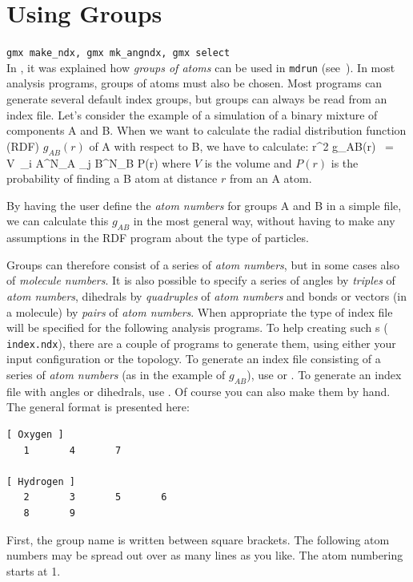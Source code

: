 \section{Using Groups}
\label{sec:usinggroups}
{\tt gmx make_ndx, gmx mk_angndx, gmx select}\\
In , it was explained how {\em groups of
atoms} can be used in {\tt mdrun} (see~).
In most analysis programs, groups
of atoms must also be chosen. Most programs can generate several default
index groups, but groups can always be read from an index file. Let's
consider the example of a simulation of a binary mixture of components A and B. When
we want to calculate the radial distribution function (RDF)
$g_{AB}(r)$ of A with respect to B, we have to calculate:
\pi r^2 g_{AB}(r)      ~=~     V~\sum_{i \in A}^{N_A} \sum_{j \in B}^{N_B} P(r)
\eeq
where $V$ is the volume and $P(r)$ is the probability of finding a B atom
at distance $r$ from an A atom.

By having the user define the {\em atom numbers} for groups A and B in
a simple file, we can calculate this $g_{AB}$ in the most general way, without
having to make any assumptions in the RDF program about the type of 
particles. 

Groups can therefore consist of a series of {\em atom numbers}, but in
some cases also of {\em molecule numbers}.  It is also possible to
specify a series of angles by {\em triples} of {\em atom numbers},
dihedrals by {\em quadruples} of {\em atom numbers} and bonds or
vectors (in a molecule) by {\em pairs} of {\em atom numbers}. When
appropriate the type of index file will be specified for the following
analysis programs.  To help creating such s ({\tt
index.ndx}), there are a couple of programs to generate them, using
either your input configuration or the topology.  To generate an
index file consisting of a series of {\em atom numbers} (as in the
example of $g_{AB}$), use {\tt {}} or
{\tt {}}.  To generate an index file
with angles or dihedrals, use {\tt {}}.
Of course you can also
make them by hand. The general format is presented here:

\begin{verbatim}
[ Oxygen ]
   1       4       7

[ Hydrogen ]
   2       3       5       6
   8       9
\end{verbatim}

First, the group name is written between square brackets. The following
atom numbers may be spread out over as many lines as you like. The
atom numbering starts at 1.

